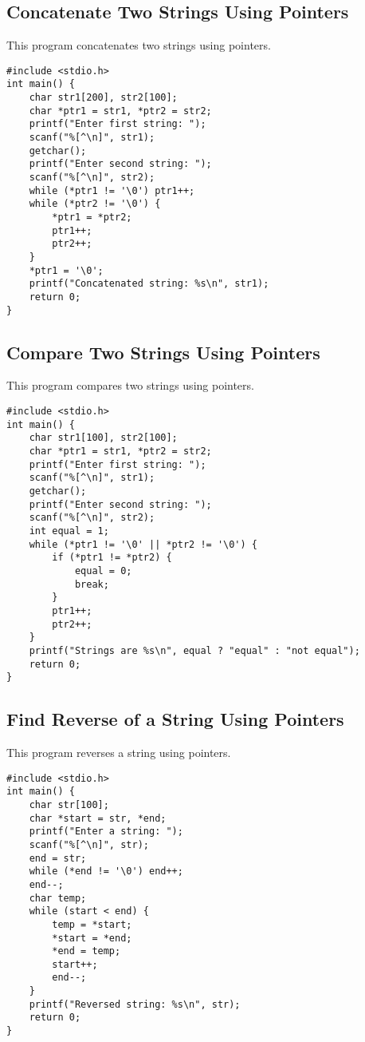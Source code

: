 \documentclass[a4paper,12pt]{article}
\begin{document}
\subsection{Concatenate Two Strings Using Pointers}
This program concatenates two strings using pointers.
\begin{lstlisting}[caption={Concatenate Two Strings Using Pointers}]
#include <stdio.h>
int main() {
    char str1[200], str2[100];
    char *ptr1 = str1, *ptr2 = str2;
    printf("Enter first string: ");
    scanf("%[^\n]", str1);
    getchar();
    printf("Enter second string: ");
    scanf("%[^\n]", str2);
    while (*ptr1 != '\0') ptr1++;
    while (*ptr2 != '\0') {
        *ptr1 = *ptr2;
        ptr1++;
        ptr2++;
    }
    *ptr1 = '\0';
    printf("Concatenated string: %s\n", str1);
    return 0;
}
\end{lstlisting}
\clearpage

\subsection{Compare Two Strings Using Pointers}
This program compares two strings using pointers.
\begin{lstlisting}[caption={Compare Two Strings Using Pointers}]
#include <stdio.h>
int main() {
    char str1[100], str2[100];
    char *ptr1 = str1, *ptr2 = str2;
    printf("Enter first string: ");
    scanf("%[^\n]", str1);
    getchar();
    printf("Enter second string: ");
    scanf("%[^\n]", str2);
    int equal = 1;
    while (*ptr1 != '\0' || *ptr2 != '\0') {
        if (*ptr1 != *ptr2) {
            equal = 0;
            break;
        }
        ptr1++;
        ptr2++;
    }
    printf("Strings are %s\n", equal ? "equal" : "not equal");
    return 0;
}
\end{lstlisting}
\clearpage

\subsection{Find Reverse of a String Using Pointers}
This program reverses a string using pointers.
\begin{lstlisting}[caption={Find Reverse of a String Using Pointers}]
#include <stdio.h>
int main() {
    char str[100];
    char *start = str, *end;
    printf("Enter a string: ");
    scanf("%[^\n]", str);
    end = str;
    while (*end != '\0') end++;
    end--;
    char temp;
    while (start < end) {
        temp = *start;
        *start = *end;
        *end = temp;
        start++;
        end--;
    }
    printf("Reversed string: %s\n", str);
    return 0;
}
\end{lstlisting}
\clearpage
\end{document}
